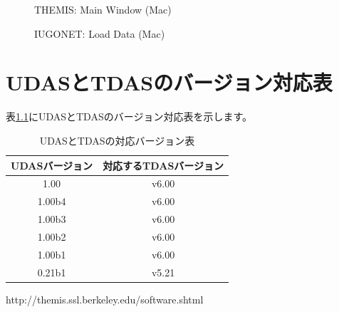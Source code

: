 \documentclass[a4j]{jbook}
\begin{document}
\begin{figure}[H]
\begin{center}
\caption{THEMIS: Main Window (Mac)}
\label{thm_gui_mac1.eps}
\end{center}
\end{figure}

\begin{figure}[H]
\begin{center}
\caption{IUGONET: Load Data (Mac)}
\label{thm_gui_mac2.eps}
\end{center}
\end{figure}

\appendix

\chapter{UDASとTDASのバージョン対応表}

表\ref{versions}にUDASとTDASのバージョン対応表を示します。

\begin{table}[H]
\begin{center}
\caption{UDASとTDASの対応バージョン表}
\label{versions}
{\small
\begin{tabular}{c|c}\hline
UDASバージョン & 対応するTDASバージョン \\ \hline
{\color{red}1.00} & {\color{red}v6.00}\\
1.00b4 & v6.00\\
1.00b3 & v6.00\\
1.00b2 & v6.00\\
1.00b1 & v6.00\\
{\color{blue}0.21b1} & {\color{blue}v5.21}\\ \hline
\end{tabular}
}
\end{center}
\end{table}

\begin{thebibliography}{1}
 http://themis.ssl.berkeley.edu/software.shtml
\end{thebibliography}
\end{document}
